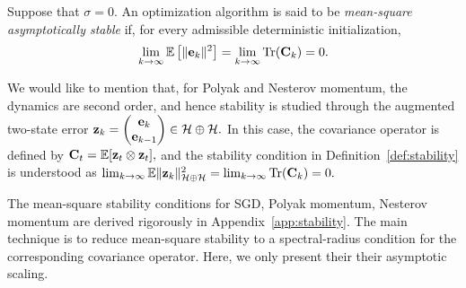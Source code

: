 \documentclass[11pt]{article}
\begin{document}
\begin{definition}
\label{def:stability}
Suppose that $\sigma=0$. An optimization algorithm is said to be
\emph{mean-square asymptotically stable} if, for every admissible deterministic initialization,
\begin{equation}
\label{eq}
\lim_{k\to\infty}
\mathbb{E}\left[\lVert\mathrm{\mathbf{e}}_k\lVert^{2}\right]
=
\lim_{k\to\infty}\mathrm{Tr}(\mathbf{C}_k)
=
0.
\end{equation}
\end{definition}
\begin{remark}
We would like to mention that, for Polyak and Nesterov momentum, the dynamics are second order, and hence stability is studied through the augmented two-state error \( \mathbf{z}_k = \begin{pmatrix} \mathrm{\mathbf{e}}_k\\ \mathrm{\mathbf{e}}_{k-1} \end{pmatrix} \in\mathcal H\oplus\mathcal H. \) In this case, the covariance operator is defined by \( \mathbf{C}_t = \mathbb{E}[\mathbf{z}_t\otimes\mathbf{z}_t], \) and the stability condition in Definition~\ref{def:stability} is understood as \( \lim_{k\to\infty} \mathbb{E}\|\mathbf{z}_k\|_{\mathcal H\oplus\mathcal H}^{2} = \lim_{k\to\infty}\mathrm{Tr}(\mathbf{C}_k) = 0. \) 
\end{remark}
The mean-square stability conditions for SGD, Polyak momentum, Nesterov momentum are derived rigorously in Appendix~\ref{app:stability}. The main technique is to reduce mean-square stability to a spectral-radius condition for the corresponding covariance operator. Here, we only present their their asymptotic scaling.
\end{document}
